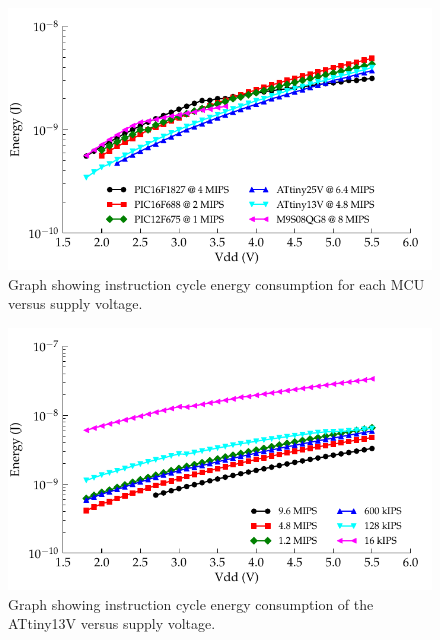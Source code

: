       \begin{figure}
      \begin{centering}
      \includegraphics{content/pt1/03-EnergyRequirements/graphics/Graph_All_Clock_JPI}
      \par\end{centering}

      \protect\caption{\label{fig:Per-instruction-cycle}Graph showing instruction cycle energy consumption for each MCU versus supply voltage.}
      \end{figure}
      \begin{figure}
      \begin{centering}
      \includegraphics{content/pt1/03-EnergyRequirements/graphics/Graph_ATtiny13V_Clock_JPI}
      \par\end{centering}

      \protect\caption{\label{fig:Per-instruction-ATtiny13V}Graph showing instruction cycle energy consumption of the ATtiny13V versus supply voltage.}
      \end{figure}



